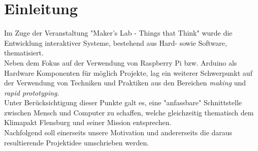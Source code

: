 \documentclass[.../Dokumentation.tex]{subfiles}
\begin{document}
\section{Einleitung}\label{sec-intr}
Im Zuge der Veranstaltung "Maker's Lab - Things that Think" wurde die 
Entwicklung interaktiver Systeme, bestehend aus Hard- sowie Software, 
thematisiert.\\
Neben dem Fokus auf der Verwendung von Raspberry Pi bzw. Arduino als Hardware 
Komponenten für möglich Projekte, lag ein weiterer Schwerpunkt auf der 
Verwendung von Techniken und Praktiken aus den Bereichen \textit{making} und 
\textit{rapid prototyping}.\\
Unter Berücksichtigung dieser Punkte galt es, eine "anfassbare" Schnittstelle 
zwischen Mensch und Computer zu schaffen, welche gleichzeitig thematisch dem 
Klimapakt Flensburg und seiner Mission entsprechen.\\
Nachfolgend soll einerseits unsere Motivation und andererseits die daraus 
resultierende Projektidee umschrieben werden.
\end{document}
